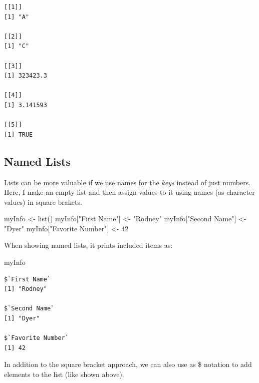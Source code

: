 \documentclass[
  letterpaper,
]{book}
\newenvironment{Shaded}{\begin{snugshade}}{\end{snugshade}}
\newcommand{\ConstantTok}[1]{\textcolor[rgb]{0.56,0.35,0.01}{#1}}
\newcommand{\DecValTok}[1]{\textcolor[rgb]{0.68,0.00,0.00}{#1}}
\newcommand{\FunctionTok}[1]{\textcolor[rgb]{0.28,0.35,0.67}{#1}}
\newcommand{\NormalTok}[1]{\textcolor[rgb]{0.00,0.23,0.31}{#1}}
\newcommand{\OtherTok}[1]{\textcolor[rgb]{0.00,0.23,0.31}{#1}}
\newcommand{\SpecialCharTok}[1]{\textcolor[rgb]{0.37,0.37,0.37}{#1}}
\newcommand{\StringTok}[1]{\textcolor[rgb]{0.13,0.47,0.30}{#1}}
\begin{document}
\begin{verbatim}
[[1]]
[1] "A"

[[2]]
[1] "C"

[[3]]
[1] 323423.3

[[4]]
[1] 3.141593

[[5]]
[1] TRUE
\end{verbatim}

\subsection{Named Lists}\label{named-lists}

Lists can be more valuable if we use names for the \emph{keys} instead
of just numbers. Here, I make an empty list and then assign values to it
using names (as character values) in square brakets.

\begin{Shaded}
\begin{Highlighting}[]
\NormalTok{myInfo }\OtherTok{\textless{}{-}} \FunctionTok{list}\NormalTok{()}
\NormalTok{myInfo[}\StringTok{"First Name"}\NormalTok{] }\OtherTok{\textless{}{-}} \StringTok{"Rodney"}
\NormalTok{myInfo[}\StringTok{"Second Name"}\NormalTok{] }\OtherTok{\textless{}{-}} \StringTok{"Dyer"}
\NormalTok{myInfo[}\StringTok{"Favorite Number"}\NormalTok{] }\OtherTok{\textless{}{-}} \DecValTok{42}
\end{Highlighting}
\end{Shaded}

When showing named lists, it prints included items as:

\begin{Shaded}
\begin{Highlighting}[]
\NormalTok{myInfo}
\end{Highlighting}
\end{Shaded}

\begin{verbatim}
$`First Name`
[1] "Rodney"

$`Second Name`
[1] "Dyer"

$`Favorite Number`
[1] 42
\end{verbatim}

In addition to the square bracket approach, we can also use as \$
notation to add elements to the list (like shown above).

\begin{Shaded}
\end{Shaded}
\end{document}
